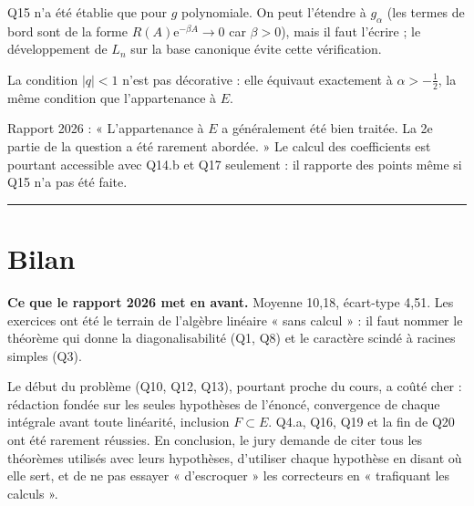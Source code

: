 \documentclass[11pt,a4paper]{article}
\begin{document}
\begin{methode}

Q15 n'a été établie que pour \(g\) polynomiale. On peut l'étendre à \(g_\alpha\) (les termes de bord sont de la forme \(R(A)\mathrm e^{-\beta A}\to0\) car \(\beta>0\)), mais il faut l'écrire ; le développement de \(L_n\) sur la base canonique évite cette vérification.

\end{methode}

\begin{piege}

La condition \(|q|<1\) n'est pas décorative : elle équivaut exactement à \(\alpha>-\frac12\), la même condition que l'appartenance à \(E\).

\end{piege}

\begin{jury}

Rapport 2026 : « L'appartenance à \(E\) a généralement été bien traitée. La 2e partie de la question a été rarement abordée. » Le calcul des coefficients est pourtant accessible avec Q14.b et Q17 seulement : il rapporte des points même si Q15 n'a pas été faite.

\end{jury}

\begin{center}\rule{0.5\linewidth}{0.5pt}\end{center}

\hypertarget{bilan}{%
\section{Bilan}\label{bilan}}

\textbf{Ce que le rapport 2026 met en avant.} Moyenne 10,18, écart-type 4,51. Les exercices ont été le terrain de l'algèbre linéaire « sans calcul » : il faut nommer le théorème qui donne la diagonalisabilité (Q1, Q8) et le caractère scindé à racines simples (Q3).

Le début du problème (Q10, Q12, Q13), pourtant proche du cours, a coûté cher : rédaction fondée sur les seules hypothèses de l'énoncé, convergence de chaque intégrale avant toute linéarité, inclusion \(F\subset E\). Q4.a, Q16, Q19 et la fin de Q20 ont été rarement réussies. En conclusion, le jury demande de citer tous les théorèmes utilisés avec leurs hypothèses, d'utiliser chaque hypothèse en disant où elle sert, et de ne pas essayer « d'escroquer » les correcteurs en « trafiquant les calculs ».
\end{document}
